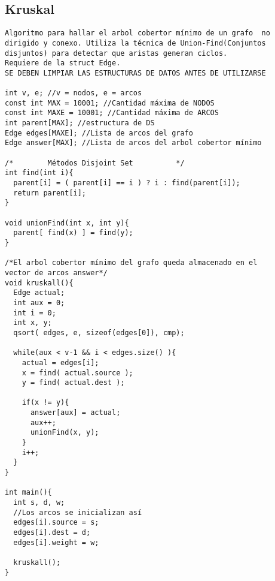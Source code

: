 \documentclass[10pt,letterpaper,twocolumn,twosided]{article}
\begin{document}
\subsection{Kruskal}
\begin{lstlisting}
Algoritmo para hallar el arbol cobertor mínimo de un grafo  no dirigido y conexo. Utiliza la técnica de Union-Find(Conjuntos disjuntos) para detectar que aristas generan ciclos.
Requiere de la struct Edge.
SE DEBEN LIMPIAR LAS ESTRUCTURAS DE DATOS ANTES DE UTILIZARSE

int v, e; //v = nodos, e = arcos
const int MAX = 10001; //Cantidad máxima de NODOS
const int MAXE = 10001; //Cantidad máxima de ARCOS
int parent[MAX]; //estructura de DS
Edge edges[MAXE]; //Lista de arcos del grafo
Edge answer[MAX]; //Lista de arcos del arbol cobertor mínimo

/*        Métodos Disjoint Set          */
int find(int i){
  parent[i] = ( parent[i] == i ) ? i : find(parent[i]);
  return parent[i];
}

void unionFind(int x, int y){
  parent[ find(x) ] = find(y);
}

/*El arbol cobertor mínimo del grafo queda almacenado en el 
vector de arcos answer*/
void kruskall(){
  Edge actual;
  int aux = 0;
  int i = 0;
  int x, y;
  qsort( edges, e, sizeof(edges[0]), cmp);

  while(aux < v-1 && i < edges.size() ){
    actual = edges[i];
    x = find( actual.source );
    y = find( actual.dest );

    if(x != y){
      answer[aux] = actual;
      aux++;
      unionFind(x, y);
    }
    i++;
  }
}

int main(){
  int s, d, w;
  //Los arcos se inicializan así
  edges[i].source = s;
  edges[i].dest = d;
  edges[i].weight = w;

  kruskall();
}\end{lstlisting}
\end{document}
